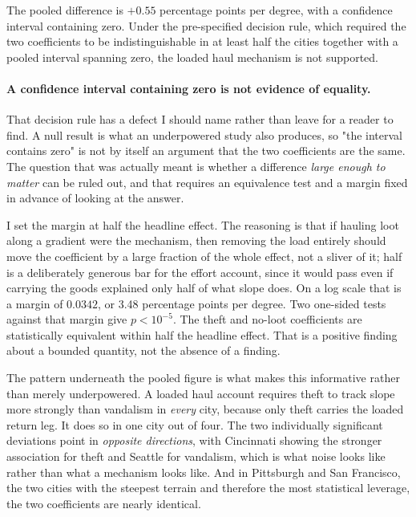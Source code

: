 \documentclass[11pt,letterpaper]{article}
\begin{document}
The pooled difference is $+0.55$ percentage points per degree, with a confidence
interval containing zero. Under the pre-specified decision rule, which required the
two coefficients to be indistinguishable in at least half the cities together with a
pooled interval spanning zero, the loaded haul mechanism is not supported.

\paragraph{A confidence interval containing zero is not evidence of equality.} That
decision rule has a defect I should name rather than leave for a reader to find. A
null result is what an underpowered study also produces, so "the interval contains
zero" is not by itself an argument that the two coefficients are the same. The
question that was actually meant is whether a difference \emph{large enough to
matter} can be ruled out, and that requires an equivalence test and a margin fixed
in advance of looking at the answer.

I set the margin at half the headline effect. The reasoning is that if hauling loot
along a gradient were the mechanism, then removing the load entirely should move the
coefficient by a large fraction of the whole effect, not a sliver of it; half is a
deliberately generous bar for the effort account, since it would pass even if
carrying the goods explained only half of what slope does. On a log scale that is a
margin of $0.0342$, or 3.48 percentage points per degree. Two one-sided tests
against that margin give $p < 10^{-5}$. The theft and no-loot coefficients are
statistically equivalent within half the headline effect. That is a positive
finding about a bounded quantity, not the absence of a finding.

The pattern underneath the pooled figure is what makes this informative rather than
merely underpowered. A loaded haul account requires theft to track slope more
strongly than vandalism in \emph{every} city, because only theft carries the loaded
return leg. It does so in one city out of four. The two individually significant
deviations point in \emph{opposite directions}, with Cincinnati showing the stronger
association for theft and Seattle for vandalism, which is what noise looks like
rather than what a mechanism looks like. And in Pittsburgh and San Francisco, the two
cities with the steepest terrain and therefore the most statistical leverage, the two
coefficients are nearly identical.
\end{document}
